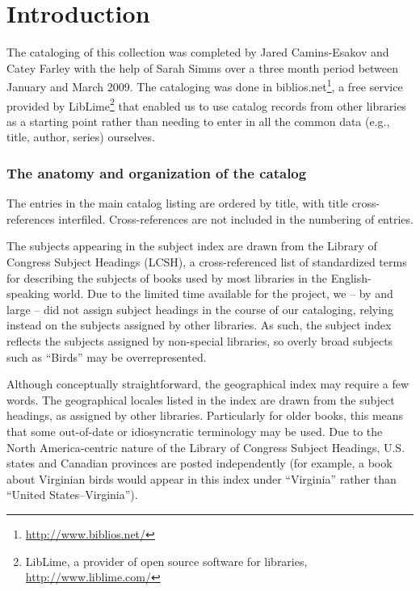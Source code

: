 \chapter*{Introduction}

The cataloging of this collection was completed by Jared Camins-Esakov and Catey
Farley with the help of Sarah Simms over a three month period between January
and March 2009. The cataloging was done in
{\ddag}biblios.net\footnote{\url{http://www.biblios.net/}}, a free service provided
by LibLime\footnote{LibLime, a provider of open source software for libraries,
\url{http://www.liblime.com/}} that enabled us to use catalog records from other
libraries as a starting point rather than needing to enter in all the common
data (e.g., title, author, series) ourselves.

\subsection*{The anatomy and organization of the catalog}

The entries in the main catalog listing are ordered by title, with title
cross-references interfiled. Cross-references are not included in the numbering
of entries.

The subjects appearing in the subject index are drawn from the Library of
Congress Subject Headings (LCSH), a cross-referenced list of standardized terms
for describing the subjects of books used by most libraries in the
English-speaking world. Due to the limited time available for the project,
we -- by and large -- did not assign subject headings in the course of our
cataloging, relying instead on the subjects assigned by other libraries. As
such, the subject index reflects the subjects assigned by non-special libraries,
so overly broad subjects such as ``Birds'' may be overrepresented.

Although conceptually straightforward, the geographical index may require a few
words. The geographical locales listed in the index are drawn from the subject
headings, as assigned by other libraries. Particularly for older books, this
means that some out-of-date or idiosyncratic terminology may be used. Due to the
North America-centric nature of the Library of Congress Subject Headings, U.S.
states and Canadian provinces are posted independently (for example, a book about
Virginian birds would appear in this index under ``Virginia'' rather than ``United
States--Virginia'').

